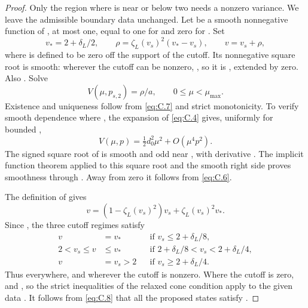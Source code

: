 \begin{proof}
%
Only the region where  is near or below two needs a nonzero variance. We leave the
admissible boundary data unchanged. Let  be a smooth nonnegative function of
, at
most one, equal to one for  and zero for
. Set
\begin{equation}
 v_*=2+\delta_L/2,
 \qquad \rho=\zeta_L(v_s)^2(v_*-v_s),
 \qquad v=v_s+\rho,
\tag{C.9}\label{eq:C.9}
\end{equation}
where  is defined to be zero off the support of the cutoff. Its nonnegative square root
is smooth: wherever the cutoff can be nonzero, , so it is
,
extended by zero. Also . Solve
\begin{equation}
 V(\mu,p_{s,2})=\rho/a,
 \qquad 0\leq\mu<\mu_{\max}.
\tag{C.10}\label{eq:C.10}
\end{equation}
Existence and uniqueness follow from \eqref{eq:C.7} and strict monotonicity. To verify smooth
dependence where , the expansion of \eqref{eq:C.4} gives, uniformly for bounded
,
\[
 V(\mu,p)=\tfrac12d_0^2\mu^2+O(\mu^4p^2).
\]
The signed square root of  is smooth and odd near , with derivative
. The
implicit function theorem applied to this square root and the smooth right side
proves smoothness through . Away from zero it follows from \eqref{eq:C.6}.

The definition of  gives
\[
 v=(1-\zeta_L(v_s)^2)v_s+\zeta_L(v_s)^2v_*.
\]
Since , the three cutoff regimes satisfy
\[
\begin{aligned}
 v&=v_* &&\text{if }v_s\leq2+\delta_L/8,\\
 2<v_s\leq v&\leq v_* &&\text{if }2+\delta_L/8<v_s<2+\delta_L/4,\\
 v&=v_s>2 &&\text{if }v_s\geq2+\delta_L/4.
\end{aligned}
\]
Thus  everywhere, and  wherever the cutoff is nonzero. Where the cutoff
is zero,  and , so the strict inequalities of the relaxed cone condition
apply to the given data . It follows from \eqref{eq:C.8} that all the proposed states satisfy
.


\end{proof}

